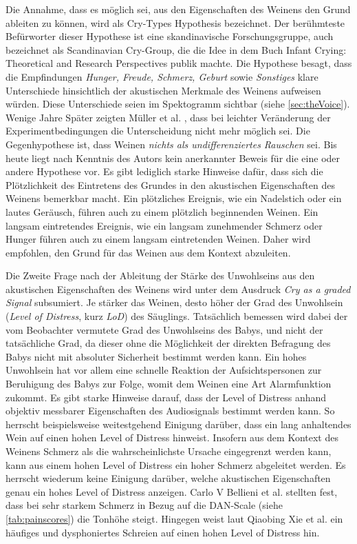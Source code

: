 Die Annahme, dass es möglich sei, aus den Eigenschaften des Weinens den Grund ableiten zu können, wird als \glqq Cry-Types Hypothesis\grqq{} bezeichnet. Der berühmteste Befürworter dieser Hypothese ist eine skandinavische Forschungsgruppe, auch bezeichnet als \glqq Scandinavian Cry-Group\grqq , die die Idee in dem Buch \glqq Infant Crying: Theoretical and Research Perspectives\grqq \cite{crygroup} publik machte. Die Hypothese besagt, dass die Empfindungen \emph{Hunger, Freude, Schmerz, Geburt} sowie \emph{Sonstiges} klare Unterschiede hinsichtlich der akustischen Merkmale des Weinens aufweisen würden. Diese Unterschiede seien im Spektogramm sichtbar (siehe \autoref{sec:theVoice}). Wenige Jahre Später zeigten Müller et al. \cite{cryisnoise}, dass bei leichter Veränderung der Experimentbedingungen die Unterscheidung nicht mehr möglich sei. Die Gegenhypothese ist, dass Weinen \emph{nichts als undifferenziertes Rauschen} sei.\cite[S. 9 - 13]{signal} Bis heute liegt nach Kenntnis des Autors kein anerkannter Beweis für die eine oder andere Hypothese vor. Es gibt lediglich starke Hinweise dafür, dass sich die Plötzlichkeit des Eintretens des Grundes in den akustischen Eigenschaften des Weinens bemerkbar macht. Ein plötzliches Ereignis, wie ein Nadelstich oder ein lautes Geräusch, führen auch zu einem plötzlich beginnenden Weinen. Ein langsam eintretendes Ereignis, wie ein langsam zunehmender Schmerz oder Hunger führen auch zu einem langsam eintretenden Weinen. Daher wird empfohlen, den Grund für das Weinen aus dem Kontext abzuleiten.\cite[S. 17 - 19]{signal}

Die Zweite Frage nach der Ableitung der Stärke des Unwohlseins aus den akustischen Eigenschaften des Weinens wird unter dem Ausdruck \emph{Cry as a graded Signal} subsumiert. Je \glqq stärker\grqq{} das Weinen, desto höher der Grad des Unwohlsein (\emph{Level of Distress}, kurz \emph{LoD}) des Säuglings. Tatsächlich bemessen wird dabei der vom Beobachter vermutete Grad des Unwohlseins des Babys, und nicht der tatsächliche Grad, da dieser ohne die Möglichkeit der direkten Befragung des Babys nicht mit absoluter Sicherheit bestimmt werden kann. Ein hohes Unwohlsein hat vor allem eine schnelle Reaktion der Aufsichtspersonen zur Beruhigung des Babys zur Folge, womit dem Weinen eine Art Alarmfunktion zukommt. Es gibt starke Hinweise darauf, dass der Level of Distress anhand objektiv messbarer Eigenschaften des Audiosignals bestimmt werden kann. So herrscht beispielsweise weitestgehend Einigung darüber, dass ein \glqq lang\grqq{} anhaltendes Wein auf einen hohen Level of Distress hinweist. Insofern aus dem Kontext des Weinens Schmerz als die wahrscheinlichste Ursache eingegrenzt werden kann, kann aus einem hohen Level of Distress ein hoher Schmerz abgeleitet werden.\cite[S. 13 - 17]{signal}\cite{lod} Es herrscht wiederum keine Einigung darüber, welche akustischen Eigenschaften genau ein hohes Level of Distress anzeigen. Carlo V Bellieni et al. \cite{dan} stellten fest, dass bei sehr starkem Schmerz in Bezug auf die DAN-Scale (siehe \autoref{tab:painscores}) die Tonhöhe steigt. Hingegen weist laut Qiaobing Xie et al. \cite{lod} ein häufiges und dysphoniertes Schreien auf einen hohen Level of Distress hin.

